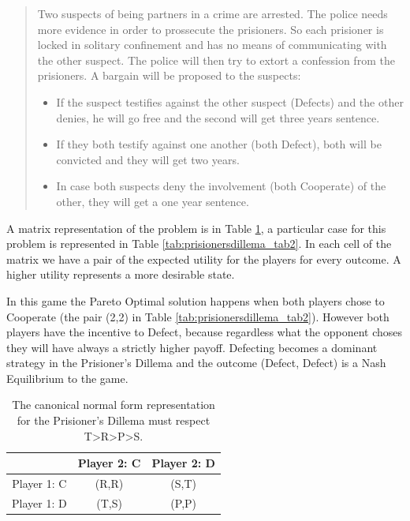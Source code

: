 \begin{quotation}

Two suspects of being partners in a crime are arrested. The police
needs more evidence in order to prossecute the prisioners. So each
prisioner is locked in solitary confinement and has no means of communicating
with the other suspect. The police will then try to extort a confession
from the prisioners. A bargain will be proposed to the suspects:
\begin{itemize}
\item If the suspect testifies against the other suspect (Defects) and the other denies, he will
go free and the second will get three years sentence.
\item If they both testify against one another (both Defect), both will
be convicted and they will get two years.
\item In case both suspects deny the involvement (both Cooperate) of the
other, they will get a one year sentence.
\end{itemize}
\end{quotation}

A matrix representation of the problem is in Table \ref{tab:prisionersdillema_tab1}, a particular case for this problem is represented in Table \ref{tab:prisionersdillema_tab2}. In each cell of the matrix we have a pair of the expected utility for the players for every outcome. A higher utility represents a more desirable state.

In this game the Pareto Optimal solution happens when both players chose to Cooperate (the pair (2,2) in Table \ref{tab:prisionersdillema_tab2}). However both players have the incentive to Defect, because regardless what the opponent choses they will have always a strictly higher payoff. Defecting becomes a dominant strategy in the Prisioner's Dillema and the outcome (Defect, Defect) is a Nash Equilibrium to the game. 

\begin{center}
\begin{table}
\begin{centering}
\begin{tabular}{ccc}
\hline 
 & Player 2: C & Player 2: D\tabularnewline
\hline 
Player 1: C & (R,R) & (S,T)\tabularnewline
Player 1: D & (T,S) & (P,P)\tabularnewline
\hline 
\end{tabular}
\par\end{centering}

\caption{The canonical normal form representation for the Prisioner's Dillema must respect T>R>P>S.}
\label{tab:prisionersdillema_tab1}
\end{table}
\par\end{center}


